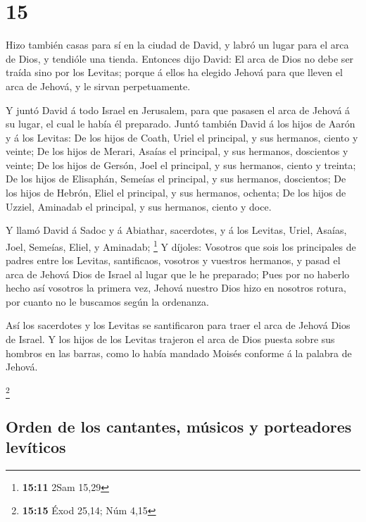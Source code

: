 \hypertarget{section-14}{%
\section{15}\label{section-14}}

 Hizo también casas para sí en la ciudad de David, y labró
un lugar para el arca de Dios, y tendióle una tienda. 
Entonces dijo David: El arca de Dios no debe ser traída sino por los
Levitas; porque á ellos ha elegido Jehová para que lleven el arca de
Jehová, y le sirvan perpetuamente.

 Y juntó David á todo Israel en Jerusalem, para que
pasasen el arca de Jehová á su lugar, el cual le había él preparado.
 Juntó también David á los hijos de Aarón y á los Levitas:
 De los hijos de Coath, Uriel el principal, y sus
hermanos, ciento y veinte;  De los hijos de Merari, Asaías
el principal, y sus hermanos, doscientos y veinte;  De los
hijos de Gersón, Joel el principal, y sus hermanos, ciento y treinta;
 De los hijos de Elisaphán, Semeías el principal, y sus
hermanos, doscientos;  De los hijos de Hebrón, Eliel el
principal, y sus hermanos, ochenta;  De los hijos de
Uzziel, Aminadab el principal, y sus hermanos, ciento y doce.

 Y llamó David á Sadoc y á Abiathar, sacerdotes, y á los
Levitas, Uriel, Asaías, Joel, Semeías, Eliel, y Aminadab; \footnote{\textbf{15:11}
  2Sam 15,29}  Y díjoles: Vosotros que sois los
principales de padres entre los Levitas, santificaos, vosotros y
vuestros hermanos, y pasad el arca de Jehová Dios de Israel al lugar que
le he preparado;  Pues por no haberlo hecho así vosotros
la primera vez, Jehová nuestro Dios hizo en nosotros rotura, por cuanto
no le buscamos según la ordenanza.

 Así los sacerdotes y los Levitas se santificaron para
traer el arca de Jehová Dios de Israel.  Y los hijos de
los Levitas trajeron el arca de Dios puesta sobre sus hombros en las
barras, como lo había mandado Moisés conforme á la palabra de Jehová.

\footnote{\textbf{15:15} Éxod 25,14; Núm 4,15}

\hypertarget{orden-de-los-cantantes-muxfasicos-y-porteadores-levuxedticos}{%
\subsection{Orden de los cantantes, músicos y porteadores
levíticos}\label{orden-de-los-cantantes-muxfasicos-y-porteadores-levuxedticos}}

